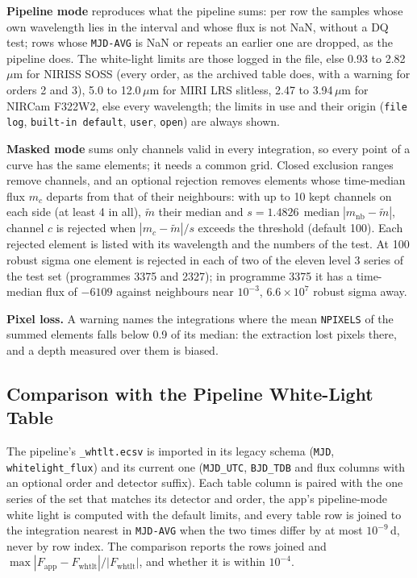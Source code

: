 \documentclass[11pt,a4paper]{article}
\newcommand{\code}[1]{\texttt{\small #1}}
\begin{document}
    \textbf{Pipeline mode} reproduces what the pipeline sums: per row the samples whose own wavelength lies in the interval and whose flux is not NaN, without a DQ test; rows whose \code{MJD-AVG} is NaN or repeats an earlier one are dropped, as the pipeline does. The white-light limits are those logged in the file, else 0.93 to 2.82\,$\mu$m for NIRISS SOSS (every order, as the archived table does, with a warning for orders 2 and 3), 5.0 to 12.0\,$\mu$m for MIRI LRS slitless, 2.47 to 3.94\,$\mu$m for NIRCam F322W2, else every wavelength; the limits in use and their origin (\code{file log}, \code{built-in default}, \code{user}, \code{open}) are always shown.

    \textbf{Masked mode} sums only channels valid in every integration, so every point of a curve has the same elements; it needs a common grid. Closed exclusion ranges remove channels, and an optional rejection removes elements whose time-median flux $m_c$ departs from that of their neighbours: with up to 10 kept channels on each side (at least 4 in all), $\tilde{m}$ their median and $s = 1.4826\,\operatorname{median}|m_{\text{nb}} - \tilde{m}|$, channel $c$ is rejected when $|m_c - \tilde{m}| / s$ exceeds the threshold (default 100). Each rejected element is listed with its wavelength and the numbers of the test. At 100 robust sigma one element is rejected in each of two of the eleven level 3 series of the test set (programmes 3375 and 2327); in programme 3375 it has a time-median flux of $-6109$ against neighbours near $10^{-3}$, $6.6 \times 10^{7}$ robust sigma away.

    \textbf{Pixel loss.} A warning names the integrations where the mean \code{NPIXELS} of the summed elements falls below 0.9 of its median: the extraction lost pixels there, and a depth measured over them is biased.

    \subsection{Comparison with the Pipeline White-Light Table}
    \label{sec:tso_whtlt}

    The pipeline's \code{\_whtlt.ecsv} is imported in its legacy schema (\code{MJD}, \code{whitelight\_flux}) and its current one (\code{MJD\_UTC}, \code{BJD\_TDB} and flux columns with an optional order and detector suffix). Each table column is paired with the one series of the set that matches its detector and order, the app's pipeline-mode white light is computed with the default limits, and every table row is joined to the integration nearest in \code{MJD-AVG} when the two times differ by at most $10^{-9}$\,d, never by row index. The comparison reports the rows joined and $\max |F_{\text{app}} - F_{\text{whtlt}}| / |F_{\text{whtlt}}|$, and whether it is within $10^{-4}$.
\end{document}
